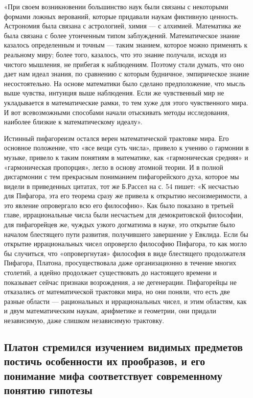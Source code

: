 «При своем  возникновении большинство  наук были связаны  с некоторыми
формами ложных верований, которые придавали наукам фиктивную ценность.
Астрономия  была   связана  с  астрологией,  химия   ---  с  алхимией.
Математика  же  была связана  с  более  утонченным типом  заблуждений.
Математическое  знание  казалось  определенным   и  точным  ---  таким
знанием,  которое  можно  применять  к  реальному  миру;  более  того,
казалось,  что это  знание получали,  исходя из  чистого мышления,  не
прибегая  к  наблюдениям.  Поэтому  стали думать,  что  оно  дает  нам
идеал знания,  по сравнению  с которым будничное,  эмпирическое знание
несостоятельно. На  основе математики было сделано  предположение, что
мысль выше чувства, интуиция выше  наблюдения. Если же чувственный мир
не  укладывается  в  математические  рамки,  то  тем  хуже  для  этого
чувственного  мира. И  вот всевозможными  способами начали  отыскивать
методы исследования, наиболее близкие к математическому идеалу».

Истинный пифагореизм остался верен  математической трактовке мира. Его
основное  положение, что  «все вещи  суть числа»,  привело к  учению о
гармонии  в  музыке,  привело  к  таким  понятиям  в  математике,  как
«гармоническая средняя»  и «гармоническая  пропорция», легло  в основу
атомной теории.  И в  полной дисгармонии  с тем  прекрасным пониманием
пифагорейского духа, которое  мы видели в приведенных  цитатах, тот же
Б.Рассел на  с. 54 пишет: «К  несчастью для Пифагора, эта  его теорема
сразу же привела к открытию несоизмеримости, а это явление опровергало
всю его философию». Как было  показано в третьей главе, иррациональные
числа были  несчастьем для демокритовской философии,  для пифагорейцев
же,  чуждых  узкого догматизма  в  науке,  это открытие  было  началом
блестящего пути  развития, получившего  завершение у Евклида.  Если бы
открытие иррациональных  чисел опровергло  философию Пифагора,  то как
могло бы  случиться, что  «опровергнутая» философия в  виде блестящего
продолжателя  Пифагора, Платона,  просуществовала даже  организационно
в  течение  многих  столетий,  а  идейно  продолжает  существовать  до
настоящего  времени и  показывает  сейчас признаки  возрождения, а  не
дегенерации.  Пифагорейцы не  отказались  от математической  трактовки
мира, но  они поняли, что есть  две разные области ---  рациональных и
иррациональных  чисел,  и этим  областям,  как  и двум  математическим
наукам, арифметике и геометрии,  они придали независимую, даже слишком
независимую трактовку.

\subsection{Платон  стремился  изучением   видимых  предметов  постичь
особенности  их   прообразов,  и  его  понимание   мифа  соответствует
современному понятию гипотезы}

